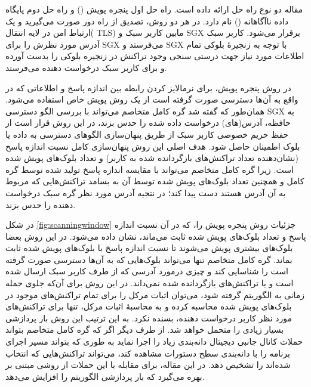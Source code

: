 مقاله \cite{Matetic2019} دو نوع راه حل ارائه داده‌ است. راه حل اول پنجره پویش () و راه حل دوم پایگاه داده ناآگاهانه () نام دارد. در هر دو روش، تصدیق از راه دور صورت می‌گیرید و یک ارتباط امن در لایه انتقال(
TLS)
مابین کاربر سبک و SGX برقرار می‌شود. کاربر سبک آدرس مورد نظرش را برای SGX می‌فرستد و SGX با توجه به زنجیرهٔ بلوکی تمام اطلاعات مورد نیاز جهت درستی سنجی وجود تراکنش در زنجیره بلوکی را بدست آورده و برای کاربر سبک درخواست دهنده می‌فرستد. 

در روش پنجره پویش، برای نرمالایز کردن رابطه بین اندازه پاسخ‌ و اطلاعاتی که در واقع به آن‌ها دسترسی صورت گرفته است از یک روش پویش خاص استفاده می‌شود. همان‌طور که گفته شد گره کامل متخاصم می‌تواند با بررسی الگو دسترسی SGX به حافظه، آدرس(های) درخواست داده شده را حدس بزند، در این روش قرار است از حفظ حریم خصوصی کاربر سبک از طریق پنهان‌سازی الگو‌های دسترسی به داده‌ یا بلوک اطمینان حاصل شود. هدف اصلی این روش پنهان‌سازی کامل نسبت اندازه پاسخ (نشان‌دهنده تعداد تراکنش‌های بازگردانده شده به کاربر) و تعداد بلوک‌های پویش شده است. زیرا گره کامل متخاصم می‌تواند با مقایسه اندازه پاسخ تولید شده توسط گره کامل و همچنین تعداد بلوک‌های پویش شده توسط آن به بسامد تراکنش‌هایی که مربوط به آن آدرس هستند دست پیدا کند؛ در نتجیه آدرس مورد نظر گره سبک درخواست دهنده را حدس بزند.

در شکل \ref{fig:scanningwindow} جزئیات روش پنجره پویش را، که در آن نسبت اندازه پاسخ و تعداد بلوک‌های پویش شده ثابت می‌ماند، نشان داده می‌شود. در این روش بعضا بلوک‌های بیشتری پویش می‌شوند تا نسبت اندازه پاسخ با بلوک‌های پویش شده ثابت بماند. گره کامل متخاصم تنها می‌تواند بلوک‌هایی که به آن‌ها دسترسی صورت گرفته است را شناسایی کند و چیزی درمورد آدرسی که از طرف کاربر سبک ارسال شده است و یا تراکنش‌های بازگردانده شده نمی‌داند. در این روش برای آن‌که جلوی  حمله زمانی به الگوریتم گرفته شود، می‌توان اثبات مرکل را برای تمام تراکنش‌های موجود در بلوک‌های پویش شده محاسبه کرده و به محاسبهٔ اثبات مرکل، تنها برای تراکنش‌های مورد نظر کاربر درخواست دهنده، بسنده نکرد. به این ترتیب این روش بار پردازشی بسیار زیادی را متحمل خواهد شد. از طرف دیگر اگر که گره کامل متخاصم بتواند حملات کانال جانبی دیجیتال دانه‌بندی زیاد را اجرا نماید به طوری که بتواند مسیر اجرای برنامه را با دانه‌بندی سطح دستورات مشاهده کند، می‌تواند تراکنش‌هایی که انتخاب شده‌اند را تشخیص دهد. در این مقاله، برای مقابله با این حملات از روشی مبتنی بر \cite{Rane2015} بهره می‌گیرد که بار پردازشی الگوریتم را افزایش می‌دهد.

